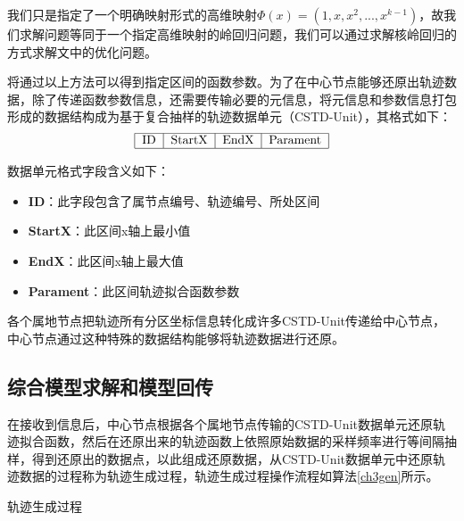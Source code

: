 我们只是指定了一个明确映射形式的高维映射$\varPhi \left( x \right) =\left( 1,x,x^2,...,x^{k-1} \right) $，故我们求解问题等同于一个指定高维映射的岭回归问题，我们可以通过求解核岭回归的方式求解文中的优化问题。

将通过以上方法可以得到指定区间的函数参数。为了在中心节点能够还原出轨迹数据，除了传递函数参数信息，还需要传输必要的元信息，将元信息和参数信息打包形成的数据结构成为基于复合抽样的轨迹数据单元（CSTD-Unit），其格式如下：
$$
\begin{tabular}{|c|c|c|c|}
\hline ID&StartX&EndX&Parament\\
\hline
\end{tabular}
$$

数据单元格式字段含义如下：
\begin{itemize}
\item \textbf{ID}：此字段包含了属节点编号、轨迹编号、所处区间
\item \textbf{StartX}：此区间x轴上最小值
\item \textbf{EndX}：此区间x轴上最大值
\item \textbf{Parament}：此区间轨迹拟合函数参数
\end{itemize}

各个属地节点把轨迹所有分区坐标信息转化成许多CSTD-Unit传递给中心节点，中心节点通过这种特殊的数据结构能够将轨迹数据进行还原。

\subsection{综合模型求解和模型回传}

在接收到信息后，中心节点根据各个属地节点传输的CSTD-Unit数据单元还原轨迹拟合函数，然后在还原出来的轨迹函数上依照原始数据的采样频率进行等间隔抽样，得到还原出的数据点，以此组成还原数据，从CSTD-Unit数据单元中还原轨迹数据的过程称为轨迹生成过程，轨迹生成过程操作流程如算法\ref{ch3gen}所示。
\begin{algorithm}[H]
	\label{ch3gen}
	 \caption{轨迹生成过程}
\end{algorithm}

